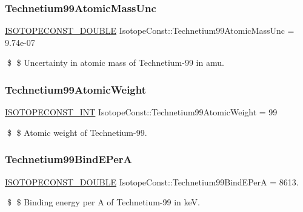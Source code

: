 \subsubsection{\texorpdfstring{Technetium99\+Atomic\+Mass\+Unc}{Technetium99AtomicMassUnc}}
{\footnotesize\ttfamily \mbox{\hyperlink{group___isotope_const-_macros_ga8f45a7272ce02c0b4c65c44636ed719a}{I\+S\+O\+T\+O\+P\+E\+C\+O\+N\+S\+T\+\_\+\+D\+O\+U\+B\+LE}} Isotope\+Const\+::\+Technetium99\+Atomic\+Mass\+Unc = 9.\+74e-\/07}

\$ \$ Uncertainty in atomic mass of Technetium-\/99 in amu. \mbox{\label{group___isotope_const-_technetium-_tc99_ga387580c172d738300cb33a2949ecc48e}} 
\subsubsection{\texorpdfstring{Technetium99\+Atomic\+Weight}{Technetium99AtomicWeight}}
{\footnotesize\ttfamily \mbox{\hyperlink{group___isotope_const-_macros_ga5f18360b3e99483a35c32d789e62621c}{I\+S\+O\+T\+O\+P\+E\+C\+O\+N\+S\+T\+\_\+\+I\+NT}} Isotope\+Const\+::\+Technetium99\+Atomic\+Weight = 99}

\$ \$ Atomic weight of Technetium-\/99. \mbox{\label{group___isotope_const-_technetium-_tc99_gac4f7707ba28d1ae50377e0ace73b82a9}} 
\subsubsection{\texorpdfstring{Technetium99\+Bind\+E\+PerA}{Technetium99BindEPerA}}
{\footnotesize\ttfamily \mbox{\hyperlink{group___isotope_const-_macros_ga8f45a7272ce02c0b4c65c44636ed719a}{I\+S\+O\+T\+O\+P\+E\+C\+O\+N\+S\+T\+\_\+\+D\+O\+U\+B\+LE}} Isotope\+Const\+::\+Technetium99\+Bind\+E\+PerA = 8613.}

\$ \$ Binding energy per A of Technetium-\/99 in keV. \mbox{\label{group___isotope_const-_technetium-_tc99_gaf745b14e688dd0e81672a41bdda72732}} 
